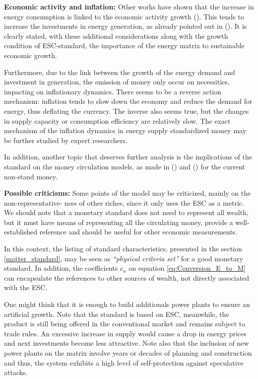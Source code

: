 \documentclass[11pt]{article}
\begin{document}
\noindent\textbf{Economic activity and inflation:} Other works have shown that the increase in energy consumption is linked to the economic 
activity growth (\citealt{ENERGYCONSUMIPTION01, ENERGYCONSUMIPTION02}). This tends to increase the investments in energy generation, as 
already pointed out in (\citealt{PROP_ENERGIA_ANTERIOR2}). It is clearly stated, with these additional considerations along with the growth 
condition of ESC-standard, the importance of the energy matrix to sustainable economic growth.

Furthermore, due to the link between the growth of the energy demand and investment in generation, the emission of money only occur on 
necessities, impacting on inflationary dynamics. There seems to be a reverse action mechanism: inflation tends to slow down the economy and 
reduce the demand for energy, thus deflating the currency. The inverse also seems true, but the changes in supply capacity or consumption 
efficiency are relatively slow. The exact mechanism of the inflation dynamics in energy supply standardized money may be further studied by 
expert researchers.

In addition, another topic that deserves further analysis is the implications of the standard on the money circulation models, as made in 
(\citealt{MONEYMODEL02, MONEYMODEL01}) and (\citealt{Yakovenko2016}) for the current non-stand money.

\noindent\textbf{Possible criticisms:} Some points of the model may be criticized, mainly on the non-representative- ness of other riches, 
since it only uses the ESC as a metric. We should note that a monetary standard does not need to represent all wealth, but it must have 
means of representing all the circulating money, provide a well-established reference and should be useful for other economic measurements.

In this context, the listing of standard characteristics, presented in the section \ref{matter_standard}, may be seen as \emph{``physical 
criteria set''} for a good monetary standard. In addition, the coefficients $c_n$ on equation \ref{eq:Conversion_E_to_M} can encapsulate the 
references to other sources of wealth, not directly associated with the ESC.

One might think that it is enough to build additionals power plants to ensure an artificial growth. Note that the standard is based on ESC, 
meanwhile, the product is still being offered in the conventional market and remains subject to trade rules. An excessive increase in supply 
would cause a drop in energy prices and next investments become less attractive. Note also that the inclusion of new power plants on the 
matrix involve years or decades of planning and construction and thus, the system exhibits a high level of self-protection against 
speculative attacks.
\end{document}
